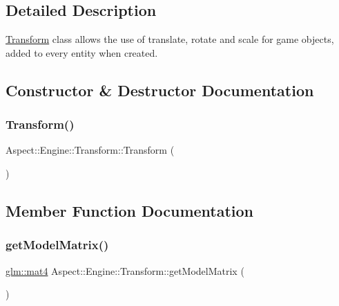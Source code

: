\subsection{Detailed Description}
\mbox{\hyperlink{class_aspect_1_1_engine_1_1_transform}{Transform}} class allows the use of translate, rotate and scale for game objects, added to every entity when created. 

\subsection{Constructor \& Destructor Documentation}
\mbox{\label{class_aspect_1_1_engine_1_1_transform_ad7f417015e9ea12b8cfeb07b7819ddf7}} 
\subsubsection{\texorpdfstring{Transform()}{Transform()}}
{\footnotesize\ttfamily Aspect\+::\+Engine\+::\+Transform\+::\+Transform (\begin{DoxyParamCaption}{ }\end{DoxyParamCaption})}



\subsection{Member Function Documentation}
\mbox{\label{class_aspect_1_1_engine_1_1_transform_a518b259100172bc76833d9f5580bfa11}} 
\subsubsection{\texorpdfstring{get\+Model\+Matrix()}{getModelMatrix()}}
{\footnotesize\ttfamily \mbox{\hyperlink{group__core__types_ga7dcd2365c2e368e6af5b7adeb6a9c8df}{glm\+::mat4}} Aspect\+::\+Engine\+::\+Transform\+::get\+Model\+Matrix (\begin{DoxyParamCaption}{ }\end{DoxyParamCaption})}

